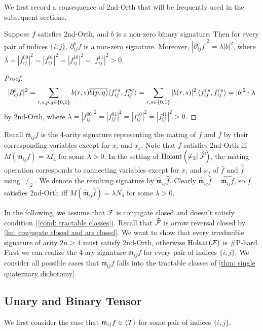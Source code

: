 We first record a consequence of {\sc 2nd-Orth} that will be frequently used in the subsequent sections.
\begin{lemma}\label{lm: 2nd-orth contraction nonzero}
    Suppose $f$ satisfies {\sc 2nd-Orth}, and $b$ is a non-zero binary signature.
    Then for every pair of indices $\{i,j\}$, $\partial_{ij}^bf$ is a non-zero signature.
    Moreover, $|\partial_{ij}^bf|^2=\lambda|b|^2$, where $\lambda=|f_{ij}^{00}|^2=|f_{ij}^{01}|^2=|f_{ij}^{10}|^2=|f_{ij}^{11}|^2>0.$
\end{lemma}
\begin{proof}
    $$|\partial_{ij}^{b}f|^2
    =
    \sum_{r,s,p,q\in\{0,1\}}
    b(r,s)\overline{b(p,q)}
    \langle f_{ij}^{rs},f_{ij}^{pq}\rangle=\sum_{r,s\in\{0,1\}}|b(r,s)|^2\braket{f_{ij}^{rs},f_{ij}^{rs}}=|b|^2\cdot\lambda$$
    by {\sc 2nd-Orth}, where $\lambda=|f_{ij}^{00}|^2=|f_{ij}^{01}|^2=|f_{ij}^{10}|^2=|f_{ij}^{11}|^2>0$.
\end{proof}

Recall $\mathfrak{m}_{ij}f$ is the 4-arity signature representing the mating of $f$ and $\overline{f}$ by their corresponding variables except for $x_i$ and $x_j$.
Note that $f$ satisfies {\sc 2nd-Orth} iff $M(\mathfrak{m}_{ij}f)=\lambda I_4$ for some $\lambda>0$.
In the setting of $\operatorname{Holant}\left(\neq_2\mid \widehat{\mathcal{F}}\right)$, the mating operation corresponds to connecting variables except for $x_i$ and $x_j$ of $\widehat{f}$ and $\widehat{\overline{f}}$ using $\neq_2$.
We denote the resulting signature by $\widehat{\mathfrak m}_{ij} \widehat{f}$.
Clearly $\widehat{\mathfrak m}_{ij} \widehat{f}=\widehat{\mathfrak{m}_{ij}f}$, so $f$ satisfies {\sc 2nd-Orth} iff $M(\widehat{\mathfrak m}_{ij} \widehat{f})=\lambda N_4$ for some $\lambda>0$.

In the following, we assume that $\mathcal{F}$ is conjugate closed and doesn't satisfy condition \rm{(\ref{cond: tractable classes})}.
Recall that $\widehat{\mathcal{F}}$ is arrow reversal closed by \cref{lm: conjugate closed and ars closed}.
We want to show that every irreducible signature of arity $2n\ge 4$ must satisfy {\sc 2nd-Orth}, otherwise $\operatorname{Holant}(\mathcal{F})$ is \#P-hard.
First we can realize the 4-ary signature $\mathfrak{m}_{ij}f$ for every pair of indices $\{i,j\}$.
We consider all possible cases that $\mathfrak{m}_{ij}f$ falls into the tractable classes of \cref{thm: single quaternary dichotomy}.

\subsection{Unary and Binary Tensor}
We first consider the case that $\mathfrak{m}_{ij}f\in \braket{\mathcal{T}}$ for some pair of indices $\{i,j\}.$

